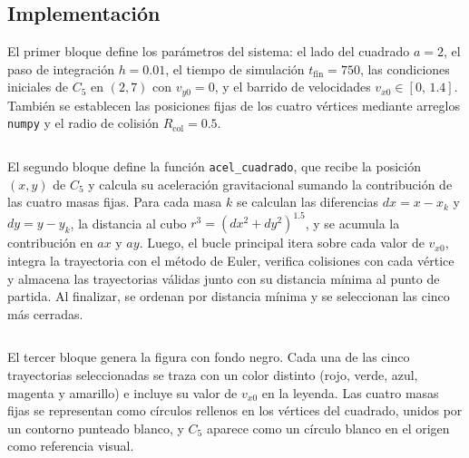 \subsection{Implementación}

El primer bloque define los parámetros del sistema: el lado del cuadrado
$a = 2$, el paso de integración $h = 0.01$, el tiempo de simulación
$t_\text{fin} = 750$, las condiciones iniciales de $C_5$ en $(2, 7)$ con
$v_{y0} = 0$, y el barrido de velocidades $v_{x0} \in [0,\, 1.4]$.
También se establecen las posiciones fijas de los cuatro vértices mediante
arreglos \texttt{numpy} y el radio de colisión $R_\text{col} = 0.5$.

\inputminted[linenos, frame=lines, fontsize=\footnotesize,
    breaklines=true, firstline=4, lastline=32
]{python}{code/problem03.py}
\label{lst:prob3_1}

\vspace{10pt}

El segundo bloque define la función \texttt{acel\_cuadrado}, que recibe la
posición $(x, y)$ de $C_5$ y calcula su aceleración gravitacional sumando la
contribución de las cuatro masas fijas. Para cada masa $k$ se calculan las
diferencias $dx = x - x_k$ y $dy = y - y_k$, la distancia al cubo
$r^3 = (dx^2 + dy^2)^{1.5}$, y se acumula la contribución en $ax$ y $ay$.
Luego, el bucle principal itera sobre cada valor de $v_{x0}$, integra
la trayectoria con el método de Euler, verifica colisiones con cada vértice
y almacena las trayectorias válidas junto con su distancia mínima al punto
de partida. Al finalizar, se ordenan por distancia mínima y se seleccionan
las cinco más cerradas.

\inputminted[linenos, frame=lines, fontsize=\footnotesize,
    breaklines=true, firstline=34, lastline=101
]{python}{code/problem03.py}
\label{lst:prob3_2}

\vspace{10pt}

El tercer bloque genera la figura con fondo negro. Cada una de las cinco
trayectorias seleccionadas se traza con un color distinto (rojo, verde, azul,
magenta y amarillo) e incluye su valor de $v_{x0}$ en la leyenda. Las cuatro
masas fijas se representan como círculos rellenos en los vértices del cuadrado,
unidos por un contorno punteado blanco, y $C_5$ aparece como un círculo blanco
en el origen como referencia visual.

